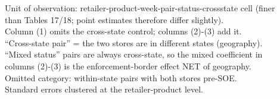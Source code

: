 \begin{table}[htbp]
   \par \raggedright 
   Unit of observation: retailer-product-week-pair-status-crossstate cell (finer\\
   than Tables 17/18; point estimates therefore differ slightly).\\
   Column (1) omits the cross-state control; columns (2)-(3) add it.\\
   ``Cross-state pair'' = the two stores are in different states (geography).\\
   ``Mixed status'' pairs are always cross-state, so the mixed coefficient in\\
   columns (2)-(3) is the enforcement-border effect NET of geography.\\
   Omitted category: within-state pairs with both stores pre-SOE.\\
   Standard errors clustered at the retailer-product level.
\end{table}


